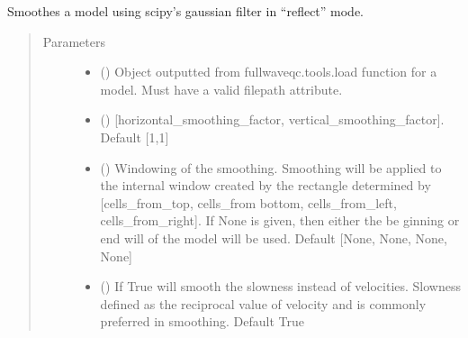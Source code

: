 \documentclass[letterpaper,10pt,english]{sphinxmanual}
\begin{document}
\begin{fulllineitems}
\label{\detokenize{index:fullwaveqc.tools.smooth_model}}
Smoothes a model using scipy’s gaussian filter in “reflect” mode.
\begin{quote}\begin{description}
\item[{Parameters}] \leavevmode\begin{itemize}
\item {} 
 ({\hyperref[\detokenize{index:fullwaveqc.tools.Model}]{}}) \textendash{} Object outputted from fullwaveqc.tools.load function for a model. Must have a valid filepath attribute.

\item {} 
 (\sphinxstyleliteralemphasis{\sphinxupquote{{[}}}\sphinxstyleliteralemphasis{\sphinxupquote{{]}}}\sphinxstyleliteralemphasis{\sphinxupquote{, }}) \textendash{} {[}horizontal\_smoothing\_factor, vertical\_smoothing\_factor{]}. Default {[}1,1{]}

\item {} 
 (\sphinxstyleliteralemphasis{\sphinxupquote{{[}}}\sphinxstyleliteralemphasis{\sphinxupquote{{]}}}\sphinxstyleliteralemphasis{\sphinxupquote{, }}) \textendash{} Windowing of the smoothing. Smoothing will be applied to the internal window created by the rectangle determined
by {[}cells\_from\_top, cells\_from bottom, cells\_from\_left, cells\_from\_right{]}. If None is given, then either the be
ginning or end will of the model will be used. Default {[}None, None, None, None{]}

\item {} 
 (\sphinxstyleliteralemphasis{\sphinxupquote{, }}) \textendash{} If True will smooth the slowness instead of velocities. Slowness defined
as the reciprocal value of velocity and is commonly preferred in smoothing. Default True


\end{itemize}
\end{description}
\end{quote}
\end{fulllineitems}
\end{document}
